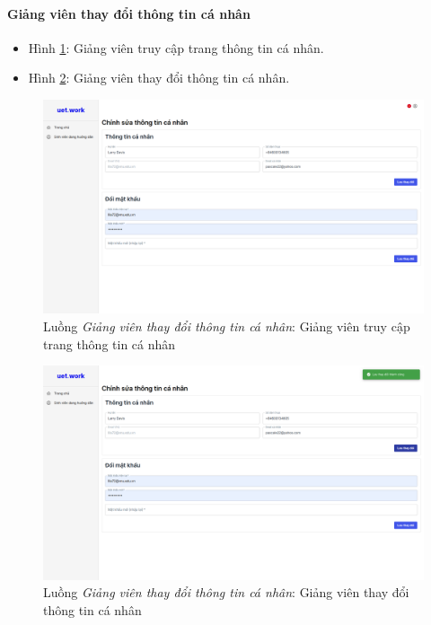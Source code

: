 \documentclass[./../main.tex]{subfiles}
\begin{document}
\paragraph*{Giảng viên thay đổi thông tin cá nhân}

\begin{itemize}
	\item Hình \ref{fig:lecturer_access_info_page}: Giảng viên truy cập trang thông tin cá nhân. 
	\item Hình \ref{fig:lecturer_edit_info}: Giảng viên thay đổi thông tin cá nhân.
\end{itemize}

\begin{figure}[]
	\includegraphics[width=\linewidth]{./images/image51.png}
	\caption{Luồng \emph{Giảng viên thay đổi thông tin cá nhân}: Giảng viên truy cập trang thông tin cá nhân}
	\label{fig:lecturer_access_info_page}
\end{figure}

\begin{figure}[]
	\includegraphics[width=\linewidth]{./images/image52.png}
	\caption{Luồng \emph{Giảng viên thay đổi thông tin cá nhân}: Giảng viên thay đổi thông tin cá nhân}
	\label{fig:lecturer_edit_info}
\end{figure}
\end{document}

